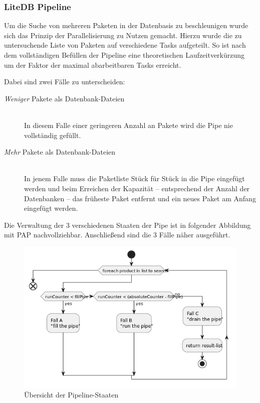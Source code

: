 \subsubsection{LiteDB Pipeline} \label{sec:ExperimentePIPE}
    Um die Suche von mehreren Paketen in der Datenbasis zu beschleunigen wurde sich das Prinzip der Parallelisierung zu Nutzen gemacht.
    Hierzu wurde die zu untersuchende Liste von Paketen auf verschiedene Tasks aufgeteilt.
    So ist nach dem vollständigen Befüllen der Pipeline eine theoretischen Laufzeitverkürzung um der Faktor der maximal abarbeitbaren Tasks erreicht.  
    
    Dabei sind zwei Fälle zu unterscheiden:
    \begin{description}
        \item[\textit{Weniger} Pakete als Datenbank-Dateien]\hfill \\
            In diesem Falle einer geringeren Anzahl an Pakete wird die Pipe nie vollständig gefüllt.
        \item[\textit{Mehr} Pakete als Datenbank-Dateien]\hfill \\
            In jenem Falle muss die Paketliste Stück für Stück in die Pipe eingefügt werden und beim Erreichen der Kapazität -- entsprechend der Anzahl der Datenbanken -- das früheste Paket entfernt und ein neues Paket am Anfang eingefügt werden.
    \end{description}
    
    Die Verwaltung der 3 verschiedenen Staaten der Pipe ist in folgender Abbildung mit \ac{PAP} nachvollziehbar.
    Anschließend sind die 3 Fälle näher ausgeführt.
    \begin{figure}[H]
        \centering
        \includegraphics[width=\textwidth]{../pap/Simultanius search on LiteDb-Files.png}
        \caption{Übersicht der Pipeline-Staaten}
        \label{png:OverviewPipelineStatus}
    \end{figure}

